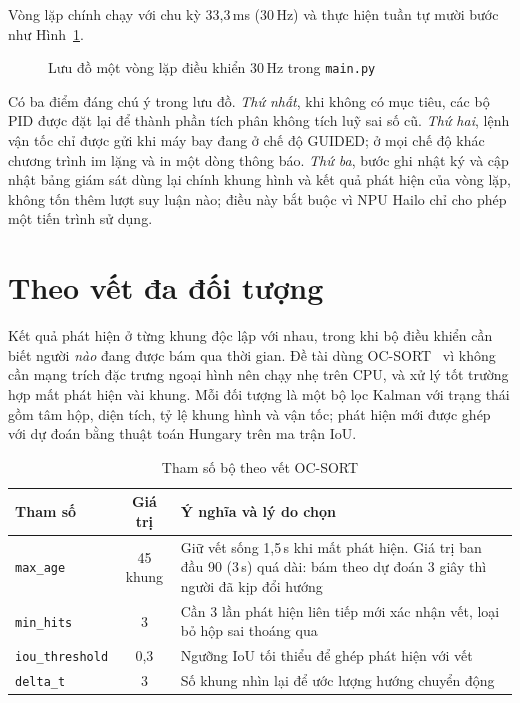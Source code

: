 Vòng lặp chính chạy với chu kỳ 33,3\,ms (30\,Hz) và thực hiện tuần tự mười bước như Hình~\ref{fig:vongdieukhien}.

\begin{figure}[H]
\centering
\resizebox{!}{0.45\textheight}{}
\caption{Lưu đồ một vòng lặp điều khiển 30\,Hz trong \texttt{main.py}}
\label{fig:vongdieukhien}
\end{figure}

Có ba điểm đáng chú ý trong lưu đồ. \textit{Thứ nhất}, khi không có mục tiêu, các bộ PID được đặt lại để thành phần tích phân không tích luỹ sai số cũ. \textit{Thứ hai}, lệnh vận tốc chỉ được gửi khi máy bay đang ở chế độ GUIDED; ở mọi chế độ khác chương trình im lặng và in một dòng thông báo. \textit{Thứ ba}, bước ghi nhật ký và cập nhật bảng giám sát dùng lại chính khung hình và kết quả phát hiện của vòng lặp, không tốn thêm lượt suy luận nào; điều này bắt buộc vì NPU Hailo chỉ cho phép một tiến trình sử dụng.

\section{Theo vết đa đối tượng}

Kết quả phát hiện ở từng khung độc lập với nhau, trong khi bộ điều khiển cần biết người \textit{nào} đang được bám qua thời gian. Đề tài dùng OC-SORT~\cite{cao2023ocsort} vì không cần mạng trích đặc trưng ngoại hình nên chạy nhẹ trên CPU, và xử lý tốt trường hợp mất phát hiện vài khung. Mỗi đối tượng là một bộ lọc Kalman với trạng thái gồm tâm hộp, diện tích, tỷ lệ khung hình và vận tốc; phát hiện mới được ghép với dự đoán bằng thuật toán Hungary trên ma trận IoU.

\begin{table}[H]
\centering
\caption{Tham số bộ theo vết OC-SORT}
\label{tab:ocsort}
\small
\renewcommand{\arraystretch}{1.15}
\begin{tabularx}{\textwidth}{@{}lc>{\raggedright\arraybackslash}X@{}}
\toprule
\textbf{Tham số} & \textbf{Giá trị} & \textbf{Ý nghĩa và lý do chọn}\\
\midrule
\texttt{max\_age} & 45 khung & Giữ vết sống 1,5\,s khi mất phát hiện. Giá trị ban đầu 90 (3\,s) quá dài: bám theo dự đoán 3 giây thì người đã kịp đổi hướng\\
\texttt{min\_hits} & 3 & Cần 3 lần phát hiện liên tiếp mới xác nhận vết, loại bỏ hộp sai thoáng qua\\
\texttt{iou\_threshold} & 0,3 & Ngưỡng IoU tối thiểu để ghép phát hiện với vết\\
\texttt{delta\_t} & 3 & Số khung nhìn lại để ước lượng hướng chuyển động\\
\bottomrule
\end{tabularx}
\end{table}

